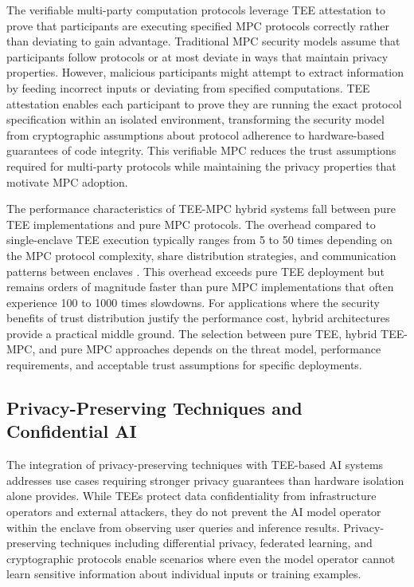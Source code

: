 The verifiable multi-party computation protocols leverage TEE attestation to prove that participants are executing specified MPC protocols correctly rather than deviating to gain advantage. Traditional MPC security models assume that participants follow protocols or at most deviate in ways that maintain privacy properties. However, malicious participants might attempt to extract information by feeding incorrect inputs or deviating from specified computations. TEE attestation enables each participant to prove they are running the exact protocol specification within an isolated environment, transforming the security model from cryptographic assumptions about protocol adherence to hardware-based guarantees of code integrity. This verifiable MPC reduces the trust assumptions required for multi-party protocols while maintaining the privacy properties that motivate MPC adoption.

The performance characteristics of TEE-MPC hybrid systems fall between pure TEE implementations and pure MPC protocols. The overhead compared to single-enclave TEE execution typically ranges from 5 to 50 times depending on the MPC protocol complexity, share distribution strategies, and communication patterns between enclaves \cite{secure_mpc}. This overhead exceeds pure TEE deployment but remains orders of magnitude faster than pure MPC implementations that often experience 100 to 1000 times slowdowns. For applications where the security benefits of trust distribution justify the performance cost, hybrid architectures provide a practical middle ground. The selection between pure TEE, hybrid TEE-MPC, and pure MPC approaches depends on the threat model, performance requirements, and acceptable trust assumptions for specific deployments.

\subsection{Privacy-Preserving Techniques and Confidential AI}

The integration of privacy-preserving techniques with TEE-based AI systems addresses use cases requiring stronger privacy guarantees than hardware isolation alone provides. While TEEs protect data confidentiality from infrastructure operators and external attackers, they do not prevent the AI model operator within the enclave from observing user queries and inference results. Privacy-preserving techniques including differential privacy, federated learning, and cryptographic protocols enable scenarios where even the model operator cannot learn sensitive information about individual inputs or training examples.

